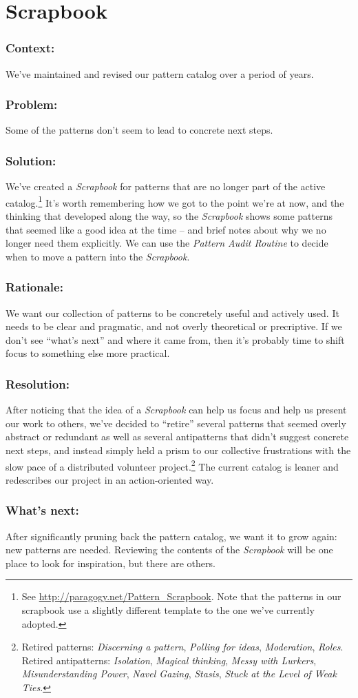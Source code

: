 \section{Scrapbook} \label{sec:Scrapbook}

\subsubsection*{Context:} We've maintained and revised our pattern catalog over a period of years.

\subsubsection*{Problem:} Some of the patterns don't seem to lead to concrete next steps.

\subsubsection*{Solution:} We've created a \emph{Scrapbook} for patterns that are no longer part of the active catalog.\footnote{See \url{http://paragogy.net/Pattern_Scrapbook}.  Note that the patterns in our scrapbook use a slightly different template to the one we've currently adopted.}  It's worth remembering how we got to the point we're at now, and the thinking that developed along the way, so the \emph{Scrapbook} shows some patterns that seemed like a good idea at the time -- and brief notes about why we no longer need them explicitly.  We can use the \emph{Pattern Audit Routine} to decide when to move a pattern into the \emph{Scrapbook}.

\subsubsection*{Rationale:} We want our collection of patterns to be concretely useful and actively used.  It needs to be clear and pragmatic, and not overly theoretical or precriptive.  If we don't see ``what's next'' and where it came from, then it's probably time to shift focus to something else more practical.

\subsubsection*{Resolution:}  After noticing that the idea of a \emph{Scrapbook} can help us focus and help us present our work to others, we've decided to ``retire'' several patterns that seemed overly abstract or redundant as well as several antipatterns that didn't suggest concrete next steps, and instead simply held a prism to our collective frustrations with the slow pace of a distributed volunteer project.\footnote{Retired patterns: \emph{Discerning a pattern}, \emph{Polling for ideas}, \emph{Moderation}, \emph{Roles}. Retired antipatterns: \emph{Isolation}, \emph{Magical thinking}, \emph{Messy with Lurkers}, \emph{Misunderstanding Power}, \emph{Navel Gazing}, \emph{Stasis}, \emph{Stuck at the Level of Weak Ties}.}  The current catalog is leaner and redescribes our project in an action-oriented way. 

\subsubsection*{What's next:} After significantly pruning back the pattern catalog, we want it to grow again: new patterns are needed.  Reviewing the contents of the \emph{Scrapbook} will be one place to look for inspiration, but there are others.

